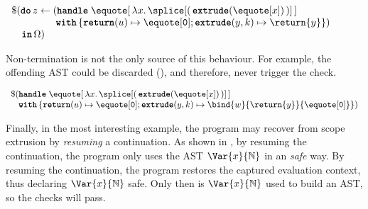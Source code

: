 \begin{code} 
 \begin{source}
  $\begin{array}{l}
      \$(\textbf{\texttt{do}} \, z \leftarrow (\textbf{\texttt{handle}} \; \equote[\, {\lambda x. \,\splice[(\,{{\textbf{\texttt{extrude}}(\equote[x])}}\,)]} \,] \\
      \quad\quad\quad\quad\,\; \textbf{\texttt{with}} \, \{ \textbf{\texttt{return}}(u) \mapsto {\equote[\texttt{0}]}; \textbf{\texttt{extrude}}(y, k) \mapsto {\return{y}}\})\\
      \quad \textbf{\texttt{in}} \, \Omega)
    \end{array}$
 \end{source}
 \label{listing:eager-scope-extrusion-unsafe}
\end{code}


Non-termination is not the only source of this behaviour. For example, the offending AST could be discarded (), and therefore, never trigger the check.

\begin{code} 
 \begin{source}
  $\begin{array}{l}
      \$(\textbf{\texttt{handle}} \; \equote[\,{\lambda x. \,\splice[(\,{{\textbf{\texttt{extrude}}(\equote[x])}}\,)]}\,] \\
      \;\;\,\, \textbf{\texttt{with}} \, \{ \textbf{\texttt{return}}(u) \mapsto {\equote[\texttt{0}]}; \textbf{\texttt{extrude}}(y, k) \mapsto {\bind{w}{\return{y}}{\equote[\texttt{0}]}}\})
    \end{array}$
 \end{source}
 \label{listing:eager-scope-extrusion-unsafe-no-use}
\end{code}

Finally, in the most interesting example, the program may recover from scope extrusion by \textit{resuming} a continuation. As shown in , by resuming the continuation, the program only uses the AST $\Var{x}{\mathbb{N}}$ in an \textit{safe} way. By resuming the continuation, the program restores the captured evaluation context, thus declaring $\Var{x}{\mathbb{N}}$ safe. Only then is $\Var{x}{\mathbb{N}}$ used to build an AST, so the checks will pass.

